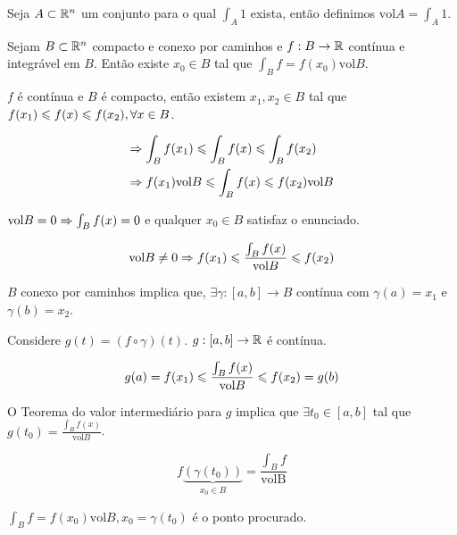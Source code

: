 \documentclass{book}
\begin{document}
\begin{defn}
Seja $A \subset \mathbb{R}^n$ um conjunto para o qual $\int_A 1$ exista, ent\~ao definimos $\text{vol}A = \int_A 1$.
\end{defn}

\begin{teo}
Sejam $B \subset \mathbb{R}^n$ compacto e conexo por caminhos e $f:B \to \mathbb{R}$ cont\'inua e integr\'avel em $B$. Ent\~ao existe $x_0 \in B$ tal que $\int_B f = f(x_0)\text{vol}B$.
\end{teo}

\begin{dem}
\begin{sloppypar}
$f$ \'e cont\'inua e $B$ \'e compacto, ent\~ao existem $x_1, x_2 \in B$ tal que ${f(x_1) \leqslant f(x) \leqslant f(x_2), \forall x \in B}$.
\end{sloppypar}

\[
\begin{gathered}
  \imp \int_B {f(x_1)} \mei \int_B {f(x)} \mei \int_B {f(x_2)} \hfill \\
  \imp f(x_1)\text{vol}B \mei \int_B {f(x)} \mei f(x_2)\text{vol}B \hfill \\ 
\end{gathered} 
\]

$\text{vol}B = 0 \Rightarrow \int_B {f(x)} = 0$ e qualquer $x_0 \in B$ satisfaz o enunciado.

\[
\text{vol}B \ne 0 \Rightarrow f(x_1) \leqslant \frac{\int_B {f(x)}}{\text{vol}B} \leqslant f(x_2)
\]

$B$ conexo por caminhos implica que, $\exists \gamma:[a,b] \to B$ cont\'inua com $\gamma(a) = x_1$ e $\gamma(b) = x_2$.

Considere $g(t) = (f \circ \gamma)(t)$. $g:[a,b] \to \mathbb{R}$ \'e cont\'inua.

\[
g(a) = f(x_1) \leqslant \frac{\int_B {f(x)}}{\text{vol}B} \leqslant f(x_2) = g(b)
\]

\begin{sloppypar}
O Teorema do valor intermedi\'ario para $g$ implica que $\exists t_0 \in [a,b]$ tal que ${g(t_0) = \frac{\int_B {f(x)}}{\text{vol}B}}$.
\end{sloppypar}

\[
f\underbrace {\left( {\gamma (t_0 )} \right)}_{x_0  \in B} = \frac{{\int_B f }}{\text{volB}}
\]

$\int_B f = f(x_0)\text{vol}B, x_0 = \gamma (t_0)$ \'e o ponto procurado.
\end{dem}
\end{document}
